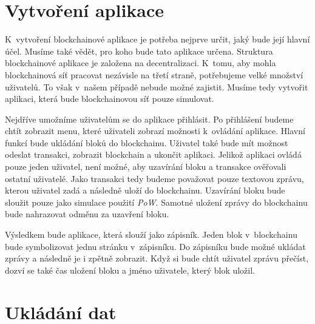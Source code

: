 \documentclass[12pt]{report}			%
\begin{document}
{	\chapter{Vytvoření aplikace}{
K~vytvoření blockchainové aplikace je potřeba nejprve určit, jaký bude její hlavní účel. Musíme také vědět, pro koho bude tato aplikace určena. Struktura blockchainové aplikace je založena na decentralizaci. K~tomu, aby mohla blockchainová síť pracovat nezávisle na třetí straně, potřebujeme velké množství uživatelů. To však v~našem případě nebude možné zajistit. Musíme tedy vytvořit aplikaci, která bude blockchainovou síť pouze simulovat. 

Nejdříve umožníme uživatelům se do aplikace přihlásit. Po přihlášení budeme chtít zobrazit menu, které uživateli zobrazí možnosti k~ovládání aplikace. Hlavní funkcí bude ukládání bloků do blockchainu. Uživatel také bude mít možnost odeslat transakci, zobrazit blockchain a ukončit aplikaci. Jelikož aplikaci ovládá pouze jeden uživatel, není možné, aby uzavírání bloku a transakce ověřovali ostatní uživatelé. Jako transakci tedy budeme považovat pouze textovou zprávu, kterou uživatel zadá a následně uloží do blockchainu. Uzavírání bloku bude sloužit pouze jako simulace použití \textit{PoW}. Samotné uložení zprávy do blockchainu bude nahrazovat odměnu za uzavření bloku. 

Výsledkem bude aplikace, která slouží jako zápisník. Jeden blok v~blockchainu bude symbolizovat jednu stránku v~zápisníku. Do zápisníku bude možné ukládat zprávy a následně je i zpětně zobrazit. Když si bude chtít uživatel zprávu přečíst, dozví se také čas uložení bloku a jméno uživatele, který blok uložil. 
}
	\chapter{Ukládání dat}{
}}
\end{document}
